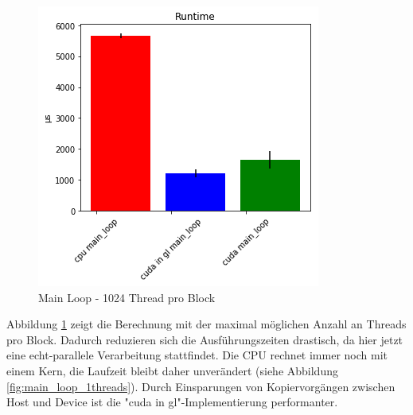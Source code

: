 \documentclass[conference]{IEEEtran}
\begin{document}
\begin{figure}[H]
\centerline{\includegraphics[scale=0.55]{img/main_loop_32threads.png}}
\label{fig:main_loop_32threads}
\caption{Main Loop - 1024 Thread pro Block}
\end{figure}
Abbildung \ref{fig:main_loop_32threads} zeigt die Berechnung mit der maximal m\"oglichen Anzahl an Threads pro Block. Dadurch reduzieren sich die Ausf\"uhrungszeiten drastisch, da hier jetzt eine echt-parallele Verarbeitung stattfindet. Die CPU rechnet immer noch mit einem Kern, die Laufzeit bleibt daher unver\"andert (siehe Abbildung \ref{fig:main_loop_1threads}). Durch Einsparungen von Kopiervorg\"angen zwischen Host und Device ist die "cuda in gl"-Implementierung performanter.
\end{document}
